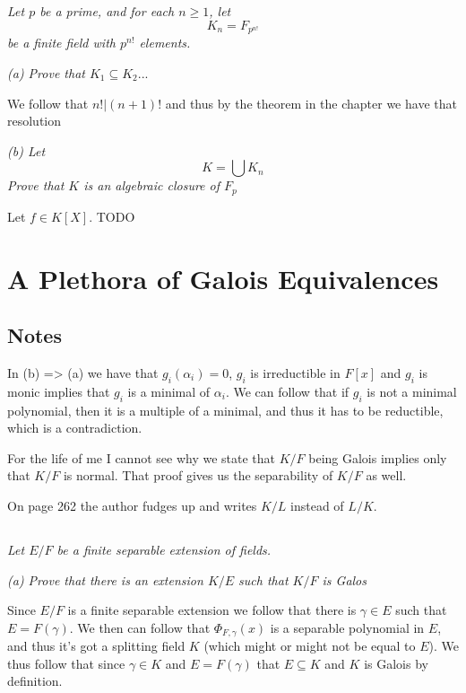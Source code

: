 \documentclass[11pt,oneside,titlepage]{book}
\begin{document}
\subsection{}

\textit{Let $p$ be a prime, and for each $n \geq 1$, let
  $$K_n = F_{p^{n!}}$$
  be a finite field with $p^{n!}$ elements.}

\textit{(a) Prove that $K_1 \subseteq K_2 ...$}

We follow that $n! | (n + 1)!$ and thus by the theorem in the chapter
we have that resolution

\textit{(b) Let
  $$K = \bigcup{K_n}$$
  Prove that $K$ is an algebraic closure of $F_p$
}

Let $f \in K[X]$. TODO

\section{A Plethora of Galois Equivalences}

\subsection*{Notes}

In (b) => (a) we have that $g_i(\alpha_i) = 0$, $g_i$ is irreductible
in $F[x]$ and $g_i$ is monic implies that $g_i$ is a minimal of
$\alpha_i$. We can follow that if $g_i$ is not a minimal polynomial,
then it is a multiple of a minimal, and thus it has to be reductible,
which is a contradiction.

For the life of me I cannot see why we state that $K/F$ being Galois
implies only that $K/F$ is normal. That proof gives us the
separability of $K/F$ as well.

On page 262 the author fudges up and writes $K/L$ instead of $L/K$.

\subsection{}

\textit{Let $E/F$ be a finite separable extension of fields.}

\textit{(a) Prove that there is an extension $K/E$ such that $K/F$ is
  Galos}

Since $E/F$ is a finite separable extension we follow that there is
$\gamma \in E$ such that $E = F(\gamma)$. We then can follow that
$\Phi_{F, \gamma}(x)$ is a separable polynomial in $E$, and thus it's
got a splitting field $K$ (which might or might not be equal to $E$).
We thus follow that since $ \gamma \in K$ and $E = F(\gamma)$ that
$E \subseteq K$ and $K$ is Galois by definition.
\end{document}
